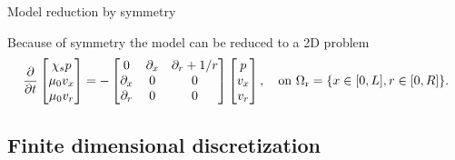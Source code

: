 \documentclass[aspectratio=169]{ISAE-Beamer}
\begin{document}
\begin{frame}{Model reduction by symmetry}
\begin{overlayarea}{\textwidth}{\textheight}

Because of symmetry the model can be reduced to a 2D problem 
\begin{equation*}
\diffp{}{t}
\begin{bmatrix}
\chi_s p \\
\mu_0 v_x \\
\mu_0 v_r \\
\end{bmatrix} = -
\begin{bmatrix}
0 & \partial_x & \partial_r + 1/r \\
\partial_x & 0 & 0 \\
\partial_r & 0 & 0 \\
\end{bmatrix}
\begin{bmatrix}
p \\
v_x \\
v_r \\
\end{bmatrix}, \quad \text{on } \Omega_{\text{r}} = \{x \in [0, L], r \in [0, R]\}.
\end{equation*}
\end{overlayarea}
\end{frame}

\subsection{Finite dimensional discretization}
\end{document}
